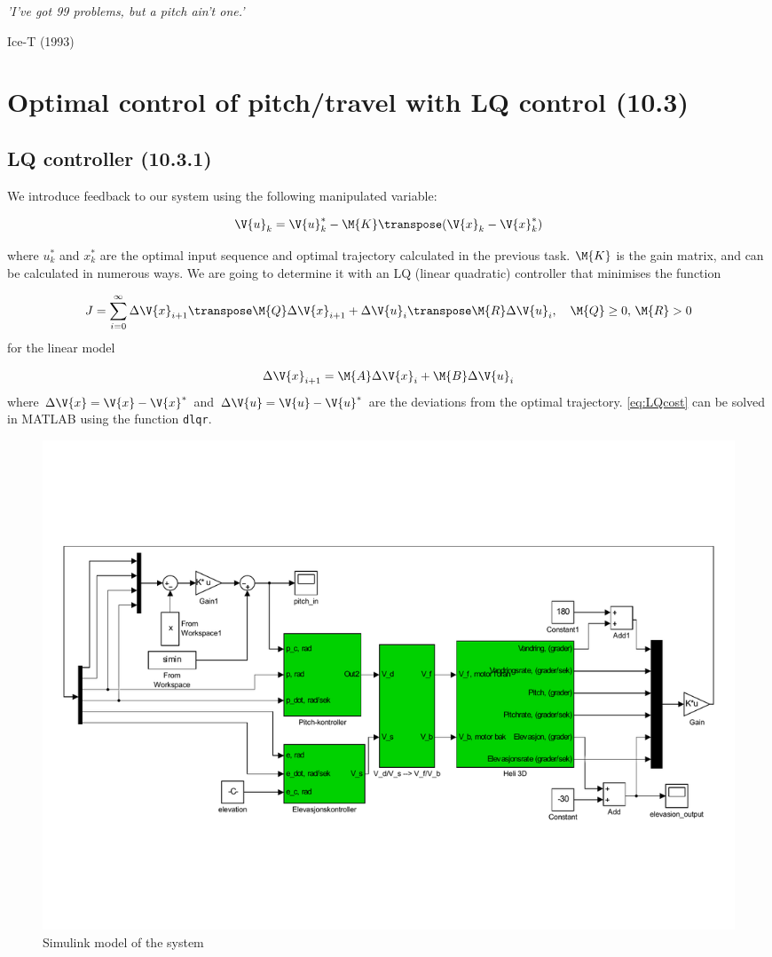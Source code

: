 \epigraph{\textit{'I've got 99 problems, but a pitch ain't one.'}}{Ice-T (1993)}

\section{Optimal control of pitch/travel with LQ control (10.3)}

\subsection{LQ controller (10.3.1)}

We introduce feedback to our system using the following manipulated variable:

\begin{equation}
	\V{u}_k = \V{u}_k^* - \M{K} \transpose (\V{x}_k - \V{x}_k^*)
\end{equation}

where $u_k^*$ and $x_k^*$ are the optimal input sequence and optimal trajectory calculated in the previous task. $\M{K}$ is the gain matrix, and can be calculated in numerous ways. We are going to determine it with an LQ (linear quadratic) controller that minimises the function

\begin{equation} \label{eq:LQcost}
	J = \sum\limits_{i=0}^{\infty} \Delta \V{x}_{i+1} \transpose \M{Q} \Delta \V{x}_{i+1} + \Delta \V{u}_{i} \transpose \M{R} \Delta \V{u}_{i}, \quad \M{Q} \geq 0, \, \M{R} > 0
\end{equation}
for the linear model

\begin{equation}
	 \Delta \V{x}_{i+1} = \M{A} \Delta \V{x}_{i} + \M{B} \Delta \V{u}_{i}
\end{equation}
where $\Delta \V{x} = \V{x} - \V{x}^*$ and $\Delta \V{u} = \V{u} - \V{u}^*$ are the deviations from the optimal trajectory. \eqref{eq:LQcost} can be solved in MATLAB using the function \texttt{dlqr}. 

\begin{figure}[H]
	\centering
	\includegraphics[width=\textwidth, trim=2cm 5cm 2cm 2cm]{simulinkmodels/heldag3}
	\caption{Simulink model of the system}
	\label{fig:heldag3}
\end{figure}

